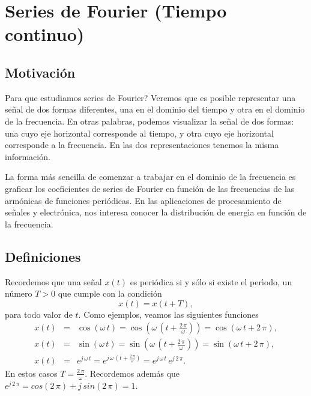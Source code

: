 \chapter{Series de Fourier (Tiempo continuo)}

\section{Motivaci\'{o}n}

\textquestiondown Para que estudiamos series de Fourier? Veremos que es posible representar una se\~{n}al de dos formas diferentes, una en el dominio del tiempo y otra en el dominio de la frecuencia. En otras palabras, podemos visualizar la se\~{n}al de dos formas: una cuyo eje horizontal corresponde al tiempo, y otra cuyo eje horizontal corresponde a la frecuencia. En las dos representaciones tenemos la misma informaci\'{o}n.

La forma m\'{a}s sencilla de comenzar a trabajar en el dominio de la frecuencia es graficar los coeficientes de series de Fourier en funci\'{o}n de las frecuencias de las arm\'{o}nicas de funciones peri\'{o}dicas. En las aplicaciones de procesamiento de se\~{n}ales y electr\'{o}nica, nos interesa conocer la distribuci\'{o}n de energ\'{\i}a en funci\'{o}n de la frecuencia.

\section{Definiciones}

Recordemos que una se\~{n}al $x(t)$ es peri\'{o}dica si y s\'{o}lo si existe el per\'{\i}odo, un n\'{u}mero $T > 0$ que cumple con la condici\'{o}n
\begin{equation}
    x\left( t\right) =x\left( t+T\right),
\end{equation}
para todo valor de $t$. Como ejemplos, veamos las siguientes funciones
\begin{eqnarray}
x(t) &=&\cos \left( \omega \, t\right) = 
\cos \left(\omega \, (t+\frac{2 \, \pi}{\omega}) \right) = \cos\left(\omega \, t + 2 \, \pi\right), \\
x\left( t\right) &=& \sin\left(\omega \, t \right) = 
\sin \left(\omega \, (t+\frac{2 \, \pi}{\omega})\right)  = \sin\left(\omega \, t + 2 \, \pi\right), \\
x\left( t\right) &=&e^{j \, \omega \, t} = e^{j \, \omega \,(t+\frac{2 \, \pi}{\omega})}  = e^{j \, \omega \, t} \, e^{j \, 2 \, \pi}.
\end{eqnarray}
En estos casos $T = \frac{2 \, \pi}{\omega}$. Recordemos adem\'{a}s que $e^{j \, 2 \, \pi} = cos(2 \, \pi) + j \, sin(2 \, \pi) = 1$.



